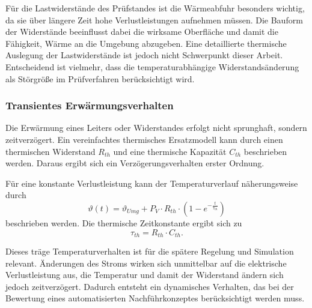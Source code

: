 Für die Lastwiderstände des Prüfstandes ist die Wärmeabfuhr besonders wichtig, da sie über längere Zeit hohe Verlustleistungen aufnehmen müssen. Die Bauform der Widerstände beeinflusst dabei die wirksame Oberfläche und damit die Fähigkeit, Wärme an die Umgebung abzugeben. Eine detaillierte thermische Auslegung der Lastwiderstände ist jedoch nicht Schwerpunkt dieser Arbeit. Entscheidend ist vielmehr, dass die temperaturabhängige Widerstandsänderung als Störgröße im Prüfverfahren berücksichtigt wird.

\subsubsection{Transientes Erwärmungsverhalten}
\label{sec:transientes_erwaermungsverhalten}

Die Erwärmung eines Leiters oder Widerstandes erfolgt nicht sprunghaft, sondern zeitverzögert. Ein vereinfachtes thermisches Ersatzmodell kann durch einen thermischen Widerstand $R_{th}$ und eine thermische Kapazität $C_{th}$ beschrieben werden. Daraus ergibt sich ein Verzögerungsverhalten erster Ordnung.

Für eine konstante Verlustleistung kann der Temperaturverlauf näherungsweise durch
\begin{equation}
    \vartheta(t) = \vartheta_{Umg} + P_V \cdot R_{th} \cdot 
    \left(1 - e^{-\frac{t}{\tau_{th}}}\right)
    \label{eq:temperaturverlauf_pt1}
\end{equation}
beschrieben werden. Die thermische Zeitkonstante ergibt sich zu
\begin{equation}
    \tau_{th} = R_{th} \cdot C_{th}.
    \label{eq:thermische_zeitkonstante}
\end{equation}

Dieses träge Temperaturverhalten ist für die spätere Regelung und Simulation relevant. Änderungen des Stroms wirken sich unmittelbar auf die elektrische Verlustleistung aus, die Temperatur und damit der Widerstand ändern sich jedoch zeitverzögert. Dadurch entsteht ein dynamisches Verhalten, das bei der Bewertung eines automatisierten Nachführkonzeptes berücksichtigt werden muss.

